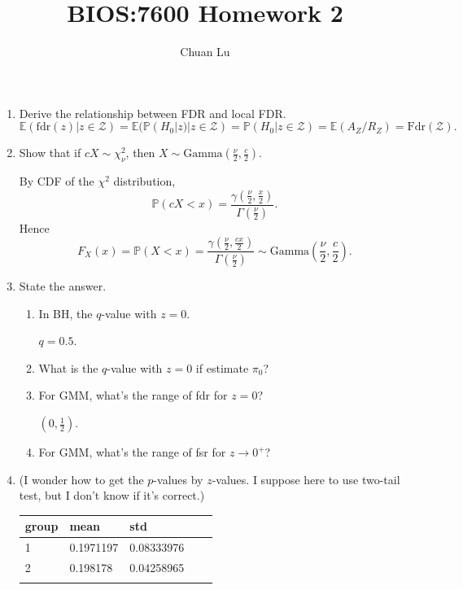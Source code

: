 \documentclass{article}
\begin{document}
\author{Chuan Lu}
\title{BIOS:7600 Homework 2}
\maketitle

\medskip

\begin{enumerate}

\item Derive the relationship between FDR and local FDR.
$$
\mathbb{E}(\text{fdr}(z)|z\in\mathcal{Z}) = \mathbb{E}(\mathbb{P}(H_0|z)|z\in\mathcal{Z}) = \mathbb{P}(H_0|z\in\mathcal{Z}) = \mathbb{E}(A_Z/R_Z) = \text{Fdr}(\mathcal{Z}).
$$

\item Show that if $cX \sim \chi_\nu^2 $, then $X \sim \text{Gamma}(\frac{\nu}{2}, \frac{c}{2})$.

By CDF of the $\chi^2 $ distribution,
$$
\mathbb{P}(cX < x) = \frac{\gamma(\frac{\nu}{2}, \frac{x}{2})}{\Gamma(\frac{\nu}{2})}.
$$
Hence
$$
F_X(x) = \mathbb{P}(X < x) = \frac{\gamma(\frac{\nu}{2}, \frac{cx}{2})}{\Gamma(\frac{\nu}{2})} \sim \text{Gamma}(\frac{\nu}{2}, \frac{c}{2}).
$$

\item State the answer.
\begin{enumerate}
\item In BH, the $q$-value with $z = 0$.

$q = 0.5$.

\item What is the $q$-value with $z = 0$ if estimate $\pi_0 $?


\item For GMM, what's the range of fdr for $z = 0$?

$(0, \frac{1}{2})$.

\item For GMM, what's the range of fsr for $z\to 0^+ $?


\end{enumerate}

\item 

(I wonder how to get the $p$-values by $z$-values. I suppose here to use two-tail test, but I don't know if it's correct.)

\begin{table}[]
\centering
\begin{tabular}{lllll}
\hline
group & mean      & std        &  &  \\
\hline
1     & 0.1971197 & 0.08333976 &  &  \\
\hline
2     & 0.198178  & 0.04258965 &  &  \\
\hline
      &           &            &  & 
\end{tabular}
\end{table}


\end{enumerate}
\end{document}

